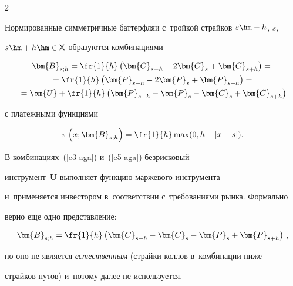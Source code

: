 \begin{multicols}{2}
  


  Нормированные симметричные баттерфляи с~тройкой страйков $s\hm-h$, $s$, 


$s\hm+h \hm\in {\mathsf X}$ образуются комбинациями 


  \begin{multline}


  \bm{B}_{s;h} = \fr{1}{h}\left( \bm{C}_{s-h} -2\bm{C}_s +\bm{C}_{s+h}\right) 


={}\\


  {}= \fr{1}{h} \left( \bm{P}_{s-h} -2\bm{P}_s+\bm{P}_{s+h}\right) 


={}\\


{}=\bm{U}+\fr{1}{h}\left( \bm{P}_{s-h} -\bm{P}_s -


\bm{C}_s+\bm{C}_{s+h}\right)


  \label{e5-aga}


  \end{multline}


с платежными функциями 


\begin{equation}


\pi \left( x;\bm{B}_{s;h}\right) =\fr{1}{h}\max ( 0, h-\vert x-s\vert).


\label{e6-aga}


\end{equation}


  


  В комбинациях~(\ref{e3-aga}) и~(\ref{e5-aga}) безрисковый 


инструмент~$\bm{U}$ выполняет функцию маржевого инструмента 


и~применяется инвестором в~соответствии с~требованиями рынка. Формально 


верно еще одно пред\-став\-ле\-ние:


  \begin{equation*}


  \bm{B}_{s;h}=\fr{1}{h}\left( \bm{C}_{s-h} -\bm{C}_s -\bm{P}_s 


+\bm{P}_{s+h}\right)\,,




  \end{equation*}


но оно не является \textit{естественным} (страйки коллов в~комбинации ниже 


страйков путов) и~потому далее не используется. 



\end{multicols}
